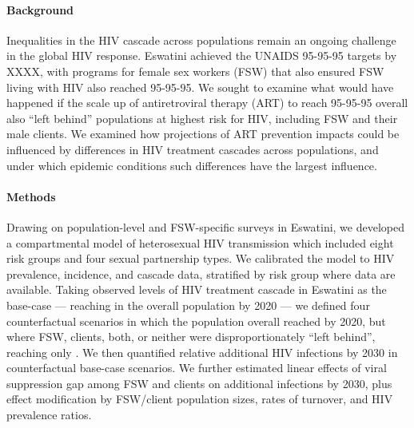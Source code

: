 \paragraph{Background}
Inequalities in the HIV cascade across populations remain
an ongoing challenge in the global HIV response.
Eswatini achieved the UNAIDS 95-95-95 targets by XXXX,
with programs for female sex workers (FSW) that also ensured
FSW living with HIV also reached 95-95-95.
We sought to examine what would have happened if the scale up of
antiretroviral therapy (ART) to reach 95-95-95 overall also 
``left behind'' populations at highest risk for HIV, including FSW and their male clients.
We examined how projections of ART prevention impacts could be influenced by
differences in HIV treatment cascades across populations, and
under which epidemic conditions such differences have the largest influence.
\paragraph{Methods}
Drawing on population-level and FSW-specific surveys in Eswatini,
we developed a compartmental model of heterosexual HIV transmission
which included eight risk groups and four sexual partnership types.
We calibrated the model to HIV prevalence, incidence, and cascade data,
stratified by risk group where data are available.
Taking observed levels of HIV treatment cascade in Eswatini as the base-case
--- reaching \cashi in the overall population by 2020 ---
we defined four counterfactual scenarios in which
the population overall reached \casmd by 2020,
but where FSW, clients, both, or neither
were disproportionately ``left behind'', reaching only \caslo.
We then quantified relative additional HIV infections by 2030
in counterfactual \vs base-case scenarios.
We further estimated linear effects of
viral suppression gap among FSW and clients on additional infections by 2030, plus
effect modification by FSW/client population sizes, rates of turnover, and HIV prevalence ratios.
